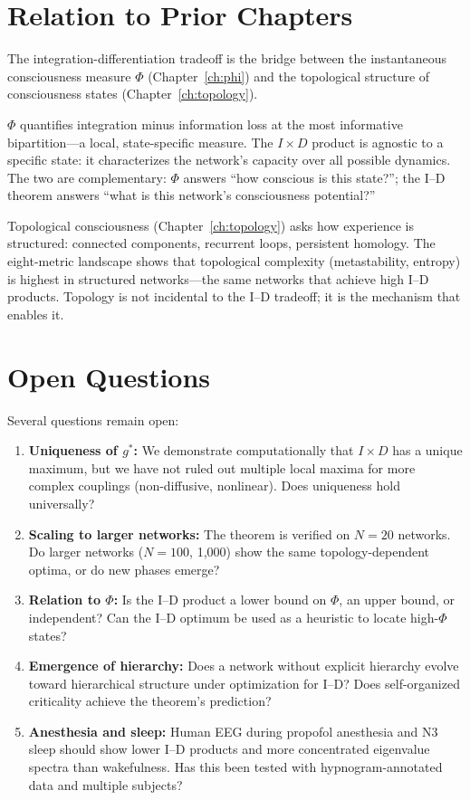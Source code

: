 \section{Relation to Prior Chapters}

The integration-differentiation tradeoff is the bridge between the instantaneous consciousness measure $\Phi$ (Chapter~\ref{ch:phi}) and the topological structure of consciousness states (Chapter~\ref{ch:topology}).

$\Phi$ quantifies integration minus information loss at the most informative bipartition---a local, state-specific measure. The $I \times D$ product is agnostic to a specific state: it characterizes the network's capacity over all possible dynamics. The two are complementary: $\Phi$ answers ``how conscious is this state?''; the I--D theorem answers ``what is this network's consciousness potential?''

Topological consciousness (Chapter~\ref{ch:topology}) asks how experience is structured: connected components, recurrent loops, persistent homology. The eight-metric landscape shows that topological complexity (metastability, entropy) is highest in structured networks---the same networks that achieve high I--D products. Topology is not incidental to the I--D tradeoff; it is the mechanism that enables it.

\section{Open Questions}

Several questions remain open:

\begin{enumerate}
  \item \textbf{Uniqueness of $g^*$:} We demonstrate computationally that $I \times D$ has a unique maximum, but we have not ruled out multiple local maxima for more complex couplings (non-diffusive, nonlinear). Does uniqueness hold universally?
  
  \item \textbf{Scaling to larger networks:} The theorem is verified on $N = 20$ networks. Do larger networks ($N = 100$, 1,000) show the same topology-dependent optima, or do new phases emerge?
  
  \item \textbf{Relation to $\Phi$:} Is the I--D product a lower bound on $\Phi$, an upper bound, or independent? Can the I--D optimum be used as a heuristic to locate high-$\Phi$ states?
  
  \item \textbf{Emergence of hierarchy:} Does a network without explicit hierarchy evolve toward hierarchical structure under optimization for I--D? Does self-organized criticality achieve the theorem's prediction?
  
  \item \textbf{Anesthesia and sleep:} Human EEG during propofol anesthesia and N3 sleep should show lower I--D products and more concentrated eigenvalue spectra than wakefulness. Has this been tested with hypnogram-annotated data and multiple subjects?
\end{enumerate}

